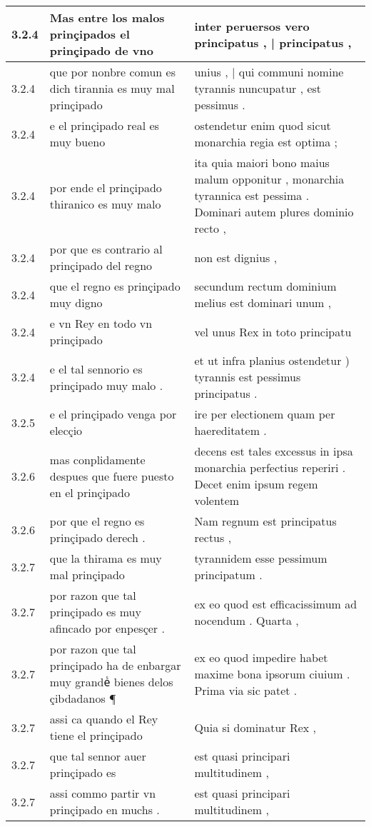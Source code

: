 \begin{tabular}{|p{1cm}|p{6.5cm}|p{6.5cm}|}
3.2.4 & Mas entre los malos prinçipados el prinçipado de vno & inter peruersos vero principatus , | principatus , \\\hline
3.2.4 & que por nonbre comun es dich tirannia es muy mal prinçipado & unius , | qui communi nomine tyrannis nuncupatur , est pessimus . \\\hline
3.2.4 & e el prinçipado real es muy bueno & ostendetur enim quod sicut monarchia regia est optima ; \\\hline
3.2.4 & por ende el prinçipado thiranico es muy malo & ita quia maiori bono maius malum opponitur , monarchia tyrannica est pessima . Dominari autem plures dominio recto , \\\hline
3.2.4 & por que es contrario al prinçipado del regno & non est dignius , \\\hline
3.2.4 & que el regno es prinçipado muy digno & secundum rectum dominium melius est dominari unum , \\\hline
3.2.4 & e vn Rey en todo vn prinçipado & vel unus Rex in toto principatu \\\hline
3.2.4 & e el tal sennorio es prinçipado muy malo . & et ut infra planius ostendetur ) tyrannis est pessimus principatus . \\\hline
3.2.5 & e el prinçipado venga por elecçio & ire per electionem quam per haereditatem . \\\hline
3.2.6 & mas conplidamente despues que fuere puesto en el prinçipado & decens est tales excessus in ipsa monarchia perfectius reperiri . Decet enim ipsum regem volentem \\\hline
3.2.6 & por que el regno es prinçipado derech . & Nam regnum est principatus rectus , \\\hline
3.2.7 & que la thirama es muy mal prinçipado & tyrannidem esse pessimum principatum . \\\hline
3.2.7 & por razon que tal prinçipado es muy afincado por enpesçer . & ex eo quod est efficacissimum ad nocendum . Quarta , \\\hline
3.2.7 & por razon que tal prinçipado ha de enbargar muy grandeᷤ bienes delos çibdadanos ¶ & ex eo quod impedire habet maxime bona ipsorum ciuium . Prima via sic patet . \\\hline
3.2.7 & assi ca quando el Rey tiene el prinçipado & Quia si dominatur Rex , \\\hline
3.2.7 & que tal sennor auer prinçipado es & est quasi principari multitudinem , \\\hline
3.2.7 & assi commo partir vn prinçipado en muchs . & est quasi principari multitudinem , \\\hline

\end{tabular}
